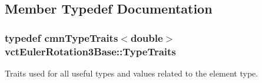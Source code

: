 \subsection{Member Typedef Documentation}
\hypertarget{classvct_euler_rotation3_base_afa97e7870204c6ff1872a0e46e45de39}{
\subsubsection[{Type\-Traits}]{\setlength{\rightskip}{0pt plus 5cm}typedef {\bf cmn\-Type\-Traits}$<$double$>$ {\bf vct\-Euler\-Rotation3\-Base\-::\-Type\-Traits}\hspace{0.3cm}{\ttfamily [protected]}}}\label{classvct_euler_rotation3_base_afa97e7870204c6ff1872a0e46e45de39}
Traits used for all useful types and values related to the element type. 

